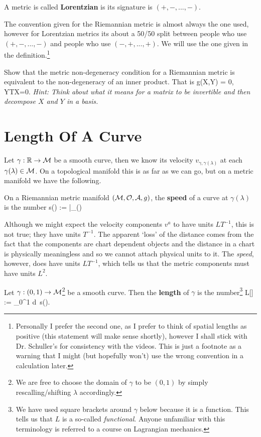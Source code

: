     A metric is called \textbf{Lorentzian} is its signature is $(+,-,...,-)$.
\ed 

\br 
    The convention given for the Riemannian metric is almost always the one used, however for Lorentzian metrics its about a 50/50 split between people who use $(+,-,...,-)$ and people who use $(-,+,...,+)$. We will use the one given in the definition.\footnote{Personally I prefer the second one, as I prefer to think of spatial lengths as positive (this statement will make sense shortly), however I shall stick with Dr. Schuller's for consistency with the videos. This is just a footnote as a warning that I might (but hopefully won't) use the wrong convention in a calculation later.}
\er 

\bbox 
    Show that the metric non-degeneracy condition for a Riemannian metric is equivalent to the non-degeneracy of an inner product. That is 
    \bse 
        g(X,Y) = 0, \quad \forall Y\in\Gamma T\cM \quad \iff \quad X=0.
    \ese 
    \textit{Hint: Think about what it means for a matrix to be invertible and then decompose $X$ and $Y$ in a basis.}
\ebox

\section{Length Of A Curve}

Let $\gamma:\mathbb{R}\to\mathcal{M}$ be a smooth curve, then we know its velocity $v_{\gamma,\gamma(\lambda)}$ at each $\gamma(\lambda)\in\mathcal{M}$. On a topological manifold this is as far as we can go, but on a metric manifold we have the following. 

    On a Riemannian metric manifold $(\mathcal{M},\mathcal{O},\mathcal{A},g)$, the \textbf{speed} of a curve at $\gamma(\lambda)$ is the number 
    \bse 
        s(\lambda) := \Big|_{\gamma(\lambda)}
    \ese 
\ed  

\br 
    Although we might expect the velocity components $v^a$ to have units $LT^{-1}$, this is not true; they have units $T^{-1}$. The apparent `loss' of the distance comes from the fact that the components are chart dependent objects and the distance in a chart is physically meaningless and so we cannot attach physical units to it. The \textit{speed}, however, does have units $LT^{-1}$, which tells us that the metric components must have units $L^2$.
\er 

\bd
    Let $\gamma: (0,1) \to \mathcal{M}$\footnote{We are free to choose the domain of $\gamma$ to be $(0,1)$ by simply rescalling/shifting $\lambda$ accordingly.} be a smooth curve. Then the \textbf{length} of $\gamma$ is the number\footnote{We have used square brackets around $\gamma$ below because it is a function. This tells us that $L$ is a so-called \textit{functional}. Anyone unfamiliar with this terminology is referred to a course on Lagrangian mechanics.}
    \bse 
        L[\gamma] := \int_0^1 d\lambda \, s(\lambda).
    \ese 
\ed 


